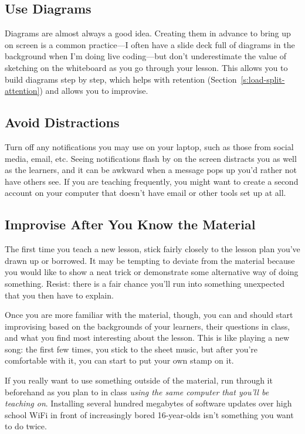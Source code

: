\subsection*{Use Diagrams}

Diagrams are almost always a good idea. Creating them in advance to
bring up on screen is a common practice---I often have a slide deck full
of diagrams in the background when I'm doing live coding---but don't
underestimate the value of sketching on the whiteboard as you go through
your lesson. This allows you to build diagrams step by step, which helps
with retention (Section~\ref{s:load-split-attention}) and allows you to
improvise.

\subsection*{Avoid Distractions}

Turn off any notifications you may use on your laptop, such as those
from social media, email, etc. Seeing notifications flash by on the
screen distracts you as well as the learners, and it can be awkward when
a message pops up you'd rather not have others see. If you are teaching
frequently, you might want to create a second account on your computer
that doesn't have email or other tools set up at all.

\subsection*{Improvise After You Know the Material}

The first time you teach a new lesson, stick fairly closely to the
lesson plan you've drawn up or borrowed. It may be tempting to deviate
from the material because you would like to show a neat trick or
demonstrate some alternative way of doing something. Resist: there is a
fair chance you'll run into something unexpected that you then have to
explain.

Once you are more familiar with the material, though, you can and should
start improvising based on the backgrounds of your learners, their
questions in class, and what you find most interesting about the lesson.
This is like playing a new song: the first few times, you stick to the
sheet music, but after you're comfortable with it, you can start to put
your own stamp on it.

If you really want to use something outside of the material, run through
it beforehand as you plan to in class \emph{using the same computer that
you'll be teaching on}. Installing several hundred megabytes of
software updates over high school WiFi in front of increasingly bored
16-year-olds isn't something you want to do twice.

